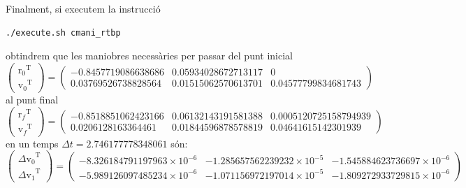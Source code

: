 \documentclass[10pt,a4paper]{article}
\newcommand{\vf}[1]{\boldsymbol{\mathrm{#1}}} %
\theoremstyle{definition}
\theoremstyle{remark}
\begin{document}
Finalment, si executem la instrucció
\begin{lstlisting}[language=Bash]
./execute.sh cmani_rtbp
\end{lstlisting}
obtindrem que les maniobres necessàries per passar del punt inicial
$$
  \begin{pmatrix}
    {\vf{r}_0}^\mathrm{T} \\
    {\vf{v}_0}^\mathrm{T}
  \end{pmatrix} =
  \begin{pmatrix}
    -0.8457719086638686 & 0.05934028672713117 & 0                   \\
    0.03769526738828564 & 0.01515062570613701 & 0.04577799834681743
  \end{pmatrix}
$$ al punt final
$$
  \begin{pmatrix}
    {\vf{r}_f}^\mathrm{T} \\
    {\vf{v}_f}^\mathrm{T}
  \end{pmatrix}=
  \begin{pmatrix}
    -0.8518851062423166 & 0.06132143191581388 & 0.0005120725158794939 \\
    0.0206128163364461  & 0.01844596878578819 & 0.04641615142301939
  \end{pmatrix}
$$ en un temps $\Delta t = 2.746177778348061$ són:
$$
  \begin{pmatrix}
    {\Delta\vf{v}_0}^\mathrm{T} \\
    {\Delta\vf{v}_1}^\mathrm{T}
  \end{pmatrix}=\begin{pmatrix}
    -8.326184791197963\times10^{-6} & -1.285657562239232\times10^{-5} & -1.545884623736697\times10^{-6} \\
    -5.989126097485234\times10^{-6} & -1.071156972197014\times10^{-5} & -1.809272933729815\times10^{-6}
  \end{pmatrix}
$$
\end{document}
